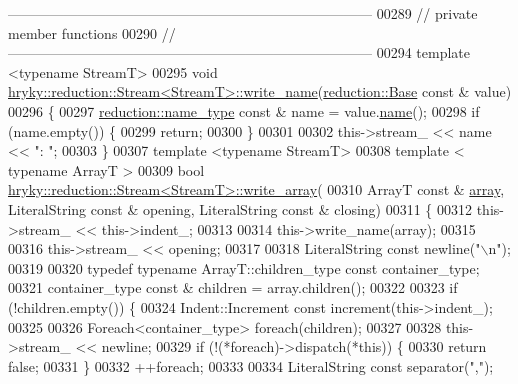 \begin{DoxyCode}
{      ------------------------------------------------------------------------------}
00289 \textcolor{comment}{// private member functions}
00290 \textcolor{comment}{//
      ------------------------------------------------------------------------------}
00294 \textcolor{comment}{}\textcolor{keyword}{template} <\textcolor{keyword}{typename} StreamT>
00295 \textcolor{keywordtype}{void} \hyperlink{classhryky_1_1reduction_1_1_stream}{hryky::reduction::Stream<StreamT>::write_name}(\hyperlink{classhryky_1_1reduction_1_1_base}{reduction::Base} \textcolor{keyword}{const} & 
      value)
00296 \{
00297     \hyperlink{classhryky_1_1reduction_1_1_string}{reduction::name_type} \textcolor{keyword}{const} & name = value.\hyperlink{classhryky_1_1reduction_1_1_base_a842569265d741905eb8a353d3935f1d1}{name}();
00298     \textcolor{keywordflow}{if} (name.empty()) \{
00299         \textcolor{keywordflow}{return};
00300     \}
00301 
00302     this->stream\_ << name << \textcolor{stringliteral}{": "};
00303 \}
00307 \textcolor{keyword}{template} <\textcolor{keyword}{typename} StreamT>
00308 \textcolor{keyword}{template} < \textcolor{keyword}{typename} ArrayT >
00309 \textcolor{keywordtype}{bool} \hyperlink{classhryky_1_1reduction_1_1_stream}{hryky::reduction::Stream<StreamT>::write_array}(
00310     ArrayT \textcolor{keyword}{const} & \hyperlink{namespacehryky_1_1reduction_a9d45a4dc1ea9a6668ebd192f296f788c}{array}, LiteralString \textcolor{keyword}{const} & opening, LiteralString \textcolor{keyword}{const} & 
      closing)
00311 \{
00312     this->stream\_ << this->indent\_;
00313 
00314     this->write\_name(array);
00315 
00316     this->stream\_ << opening;
00317 
00318     LiteralString \textcolor{keyword}{const} newline(\textcolor{stringliteral}{"\(\backslash\)n"});
00319 
00320     \textcolor{keyword}{typedef} \textcolor{keyword}{typename} ArrayT::children\_type \textcolor{keyword}{const} container\_type;
00321     container\_type \textcolor{keyword}{const} & children = array.children();
00322 
00323     \textcolor{keywordflow}{if} (!children.empty()) \{
00324         Indent::Increment \textcolor{keyword}{const} increment(this->indent\_);
00325 
00326         Foreach<container\_type> \textcolor{keywordflow}{foreach}(children);
00327 
00328         this->stream\_ << newline;
00329         \textcolor{keywordflow}{if} (!(*foreach)->dispatch(*\textcolor{keyword}{this})) \{
00330             \textcolor{keywordflow}{return} \textcolor{keyword}{false};
00331         \}
00332         ++\textcolor{keywordflow}{foreach};
00333 
00334         LiteralString \textcolor{keyword}{const} separator(\textcolor{stringliteral}{","});

\end{DoxyCode}
